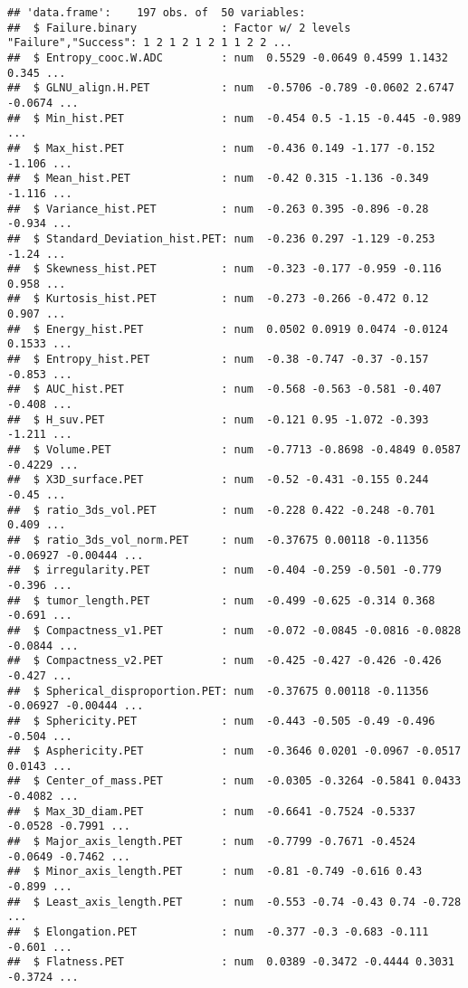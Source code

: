 \documentclass[
]{article}
\begin{document}
\begin{verbatim}
## 'data.frame':    197 obs. of  50 variables:
##  $ Failure.binary             : Factor w/ 2 levels "Failure","Success": 1 2 1 2 1 2 1 1 2 2 ...
##  $ Entropy_cooc.W.ADC         : num  0.5529 -0.0649 0.4599 1.1432 0.345 ...
##  $ GLNU_align.H.PET           : num  -0.5706 -0.789 -0.0602 2.6747 -0.0674 ...
##  $ Min_hist.PET               : num  -0.454 0.5 -1.15 -0.445 -0.989 ...
##  $ Max_hist.PET               : num  -0.436 0.149 -1.177 -0.152 -1.106 ...
##  $ Mean_hist.PET              : num  -0.42 0.315 -1.136 -0.349 -1.116 ...
##  $ Variance_hist.PET          : num  -0.263 0.395 -0.896 -0.28 -0.934 ...
##  $ Standard_Deviation_hist.PET: num  -0.236 0.297 -1.129 -0.253 -1.24 ...
##  $ Skewness_hist.PET          : num  -0.323 -0.177 -0.959 -0.116 0.958 ...
##  $ Kurtosis_hist.PET          : num  -0.273 -0.266 -0.472 0.12 0.907 ...
##  $ Energy_hist.PET            : num  0.0502 0.0919 0.0474 -0.0124 0.1533 ...
##  $ Entropy_hist.PET           : num  -0.38 -0.747 -0.37 -0.157 -0.853 ...
##  $ AUC_hist.PET               : num  -0.568 -0.563 -0.581 -0.407 -0.408 ...
##  $ H_suv.PET                  : num  -0.121 0.95 -1.072 -0.393 -1.211 ...
##  $ Volume.PET                 : num  -0.7713 -0.8698 -0.4849 0.0587 -0.4229 ...
##  $ X3D_surface.PET            : num  -0.52 -0.431 -0.155 0.244 -0.45 ...
##  $ ratio_3ds_vol.PET          : num  -0.228 0.422 -0.248 -0.701 0.409 ...
##  $ ratio_3ds_vol_norm.PET     : num  -0.37675 0.00118 -0.11356 -0.06927 -0.00444 ...
##  $ irregularity.PET           : num  -0.404 -0.259 -0.501 -0.779 -0.396 ...
##  $ tumor_length.PET           : num  -0.499 -0.625 -0.314 0.368 -0.691 ...
##  $ Compactness_v1.PET         : num  -0.072 -0.0845 -0.0816 -0.0828 -0.0844 ...
##  $ Compactness_v2.PET         : num  -0.425 -0.427 -0.426 -0.426 -0.427 ...
##  $ Spherical_disproportion.PET: num  -0.37675 0.00118 -0.11356 -0.06927 -0.00444 ...
##  $ Sphericity.PET             : num  -0.443 -0.505 -0.49 -0.496 -0.504 ...
##  $ Asphericity.PET            : num  -0.3646 0.0201 -0.0967 -0.0517 0.0143 ...
##  $ Center_of_mass.PET         : num  -0.0305 -0.3264 -0.5841 0.0433 -0.4082 ...
##  $ Max_3D_diam.PET            : num  -0.6641 -0.7524 -0.5337 -0.0528 -0.7991 ...
##  $ Major_axis_length.PET      : num  -0.7799 -0.7671 -0.4524 -0.0649 -0.7462 ...
##  $ Minor_axis_length.PET      : num  -0.81 -0.749 -0.616 0.43 -0.899 ...
##  $ Least_axis_length.PET      : num  -0.553 -0.74 -0.43 0.74 -0.728 ...
##  $ Elongation.PET             : num  -0.377 -0.3 -0.683 -0.111 -0.601 ...
##  $ Flatness.PET               : num  0.0389 -0.3472 -0.4444 0.3031 -0.3724 ...

\end{verbatim}
\end{document}
